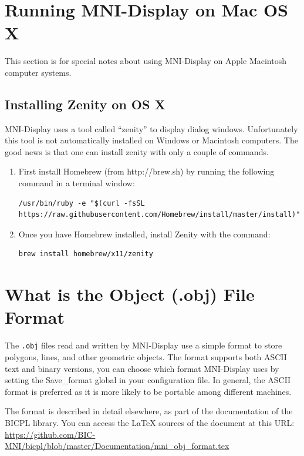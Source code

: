 \documentclass[11pt,letterpaper]{article}
\newcommand{\ident}[1]{{\tt #1}}
\newcommand{\display}{\mbox{MNI-Display}}
\begin{document}
\appendix

\section{Running \display{} on Mac OS X}

This section is for special notes about using \display{} on Apple
Macintosh computer systems.

\subsection{Installing Zenity on OS X}

\display{} uses a tool called ``zenity'' to display dialog windows. Unfortunately this tool is not automatically installed on Windows or Macintosh computers. The good news is that one can install zenity with only a couple of commands.

\begin{enumerate}
\item First install Homebrew (from http://brew.sh) by running the following command in a terminal window:
\begin{verbatim}
/usr/bin/ruby -e "$(curl -fsSL https://raw.githubusercontent.com/Homebrew/install/master/install)"
\end{verbatim}

\item Once you have Homebrew installed, install Zenity with the command:
\begin{verbatim}
brew install homebrew/x11/zenity
\end{verbatim}
\end{enumerate}








\section{What is the Object (.obj) File Format}

The \ident{.obj} files read and written by \display{} use a simple
format to store polygons, lines, and other geometric objects. The
format supports both ASCII text and binary versions, you can choose
which format \display{} uses by setting the Save\_format global in
your configuration file. In general, the ASCII format is preferred as
it is more likely to be portable among different machines.

The format is described in detail elsewhere, as part of the
documentation of the BICPL library. You can access the \LaTeX{}
sources of the document at this URL:
\url{https://github.com/BIC-MNI/bicpl/blob/master/Documentation/mni_obj_format.tex}
\end{document}
